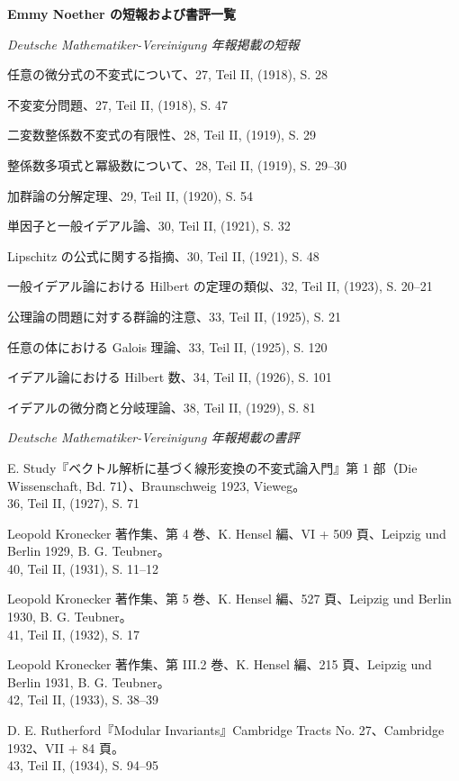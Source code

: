 \clearpage
\begin{center}
{\Large\bfseries Emmy Noether の短報および書評一覧}
\end{center}
\label{liste-der-kurzmitteilungen-und-buchbesprechungen-von-emmy-noether}

\begin{center}
\emph{Deutsche Mathematiker-Vereinigung 年報掲載の短報}
\end{center}

\begingroup
\setlength{\parindent}{0pt}
\setlength{\parskip}{0.15em}
任意の微分式の不変式について、27, Teil II, (1918), S. 28\par
不変変分問題、27, Teil II, (1918), S. 47\par
二変数整係数不変式の有限性、28, Teil II, (1919), S. 29\par
整係数多項式と冪級数について、28, Teil II, (1919), S. 29--30\par
加群論の分解定理、29, Teil II, (1920), S. 54\par
単因子と一般イデアル論、30, Teil II, (1921), S. 32\par
Lipschitz の公式に関する指摘、30, Teil II, (1921), S. 48\par
一般イデアル論における Hilbert の定理の類似、32, Teil II, (1923), S. 20--21\par
公理論の問題に対する群論的注意、33, Teil II, (1925), S. 21\par
任意の体における Galois 理論、33, Teil II, (1925), S. 120\par
イデアル論における Hilbert 数、34, Teil II, (1926), S. 101\par
イデアルの微分商と分岐理論、38, Teil II, (1929), S. 81\par
\endgroup

\begin{center}
\emph{Deutsche Mathematiker-Vereinigung 年報掲載の書評}
\end{center}

\begingroup
\setlength{\parindent}{0pt}
\setlength{\parskip}{0.35em}
E. Study『ベクトル解析に基づく線形変換の不変式論入門』第 1 部（Die Wissenschaft, Bd. 71）、Braunschweig 1923, Vieweg。\\
36, Teil II, (1927), S. 71\par
Leopold Kronecker 著作集、第 4 巻、K. Hensel 編、VI + 509 頁、Leipzig und Berlin 1929, B. G. Teubner。\\
40, Teil II, (1931), S. 11--12\par
Leopold Kronecker 著作集、第 5 巻、K. Hensel 編、527 頁、Leipzig und Berlin 1930, B. G. Teubner。\\
41, Teil II, (1932), S. 17\par
Leopold Kronecker 著作集、第 III.2 巻、K. Hensel 編、215 頁、Leipzig und Berlin 1931, B. G. Teubner。\\
42, Teil II, (1933), S. 38--39\par
D. E. Rutherford『Modular Invariants』Cambridge Tracts No. 27、Cambridge 1932、VII + 84 頁。\\
43, Teil II, (1934), S. 94--95\par
\endgroup

